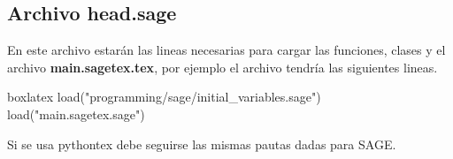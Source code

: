 {	    \subsection{Archivo head.sage}
	    En este archivo estarán las lineas necesarias para cargar las funciones, clases y el archivo \textbf{main.sagetex.tex}, por ejemplo el archivo tendría las siguientes lineas.
	    \begin{tcblisting}{boxlatex}
	    	load("programming/sage/initial_variables.sage")
	    	load("main.sagetex.sage")
	    \end{tcblisting}
	    \begin{boxbasic}
	    	Si se usa pythontex debe seguirse las mismas pautas dadas para SAGE.
	    \end{boxbasic}
}